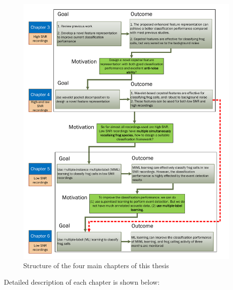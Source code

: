 \begin{figure}[htb!]
\centering
\includegraphics[width=\textwidth]{image/Ch1/structure_chapters.pdf}
\caption[Structure of the four main chapters of this thesis]{Structure of the four main chapters of this thesis}
\label{fig:mainchapters}
\end{figure}

Detailed description of each chapter is shown below:



